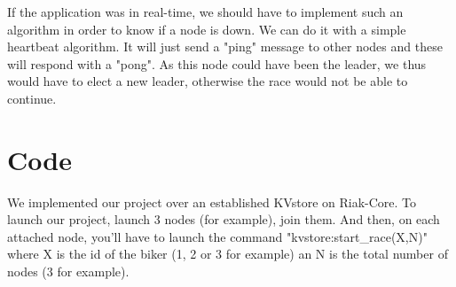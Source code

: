 \documentclass[a4paper, 11pt]{article}
\begin{document}
If the application was in real-time, we should have to implement such an algorithm in order to know if a node is down.
We can do it with a simple heartbeat algorithm.
It will just send a "ping" message to other nodes and these will respond with a "pong".
As this node could have been the leader, we thus would have to elect a new leader, otherwise the race would not be able to continue.

\section{Code}

We implemented our project over an established KVstore on Riak-Core.
To launch our project, launch 3 nodes (for example), join them.
And then, on each attached node, you'll have to launch the command "kvstore:start\_race(X,N)" where X is the id of the biker (1, 2 or 3 for example) an N is the total number of nodes (3 for example).
\end{document}

